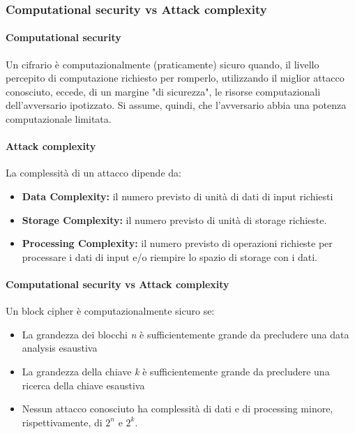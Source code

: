 \documentclass[a4paper,12pt]{article}
\begin{document}
\subsubsection{Computational security vs Attack complexity}
\paragraph{Computational security}
Un cifrario è computazionalmente (praticamente) sicuro quando, il livello percepito di computazione richiesto per romperlo, utilizzando il miglior attacco conosciuto, eccede, di un margine "di sicurezza", le risorse computazionali dell'avversario ipotizzato.
Si assume, quindi, che l'avversario abbia una potenza computazionale limitata.
\paragraph{Attack complexity}
La complessità di un attacco dipende da:
\begin{itemize}
	\item \textbf{Data Complexity:} il numero previsto di unità di dati di input richiesti
	\item \textbf{Storage Complexity:} il numero previsto di unità di storage richieste.
	\item \textbf{Processing Complexity:} il numero previsto di operazioni richieste per processare i dati di input e/o riempire lo spazio di storage con i dati.
\end{itemize}
\paragraph{Computational security vs Attack complexity}
Un block cipher è computazionalmente sicuro se:
\begin{itemize}
	\item La grandezza dei blocchi \textit{n} è sufficientemente grande da precludere una data analysis esaustiva 
	\item La grandezza della chiave \textit{k} è sufficientemente grande da precludere una ricerca della chiave esaustiva
	\item Nessun attacco conosciuto ha complessità di dati e di processing minore, rispettivamente, di $2^n$ e $2^k$.
\end{itemize}
\end{document}
